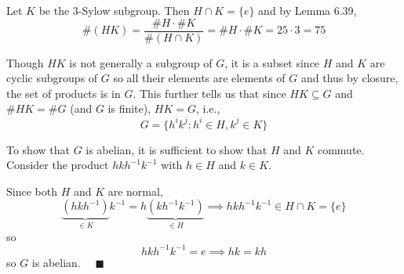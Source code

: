 \documentclass[12pt]{article}
\newcommand{\qed}{\quad \blacksquare}
\begin{document}
\begin{enumerate}
            Let $K$ be the 3-Sylow subgroup. Then $H \cap K = \{e\}$ and by Lemma 6.39,
            \[\#(HK) = \frac{\#H \cdot \#K}{\#(H \cap K)} = \#H \cdot \#K = 25 \cdot 3 = 75\]

            Though $HK$ is not generally a subgroup of $G$, it is a subset since $H$ and $K$ are cyclic subgroups of $G$ so all their elements are elements of $G$ and thus by closure, the set of products is in $G$. This further tells us that since $HK \subseteq G$ and $\#HK = \#G$ (and $G$ is finite), $HK = G$, i.e., 
            \[G = \{h^i k^j : h^i \in H, k^j \in K\}\]

            To show that $G$ is abelian, it is sufficient to show that $H$ and $K$ commute. Consider the product $hkh^{-1}k^{-1}$ with $h \in H$ and $k \in K$.

            Since both $H$ and $K$ are normal, 
            \[\underbrace{(hkh^{-1})}_{\in K}k^{-1} = h\underbrace{(kh^{-1}k^{-1})}_{\in H} \implies hkh^{-1}k^{-1} \in H \cap K = \{e\}\] 
            so 
            \[hkh^{-1}k^{-1} = e \implies hk = kh\]
            so $G$ is abelian. $\qed$
        \color{black}
    
\end{enumerate}
\end{document}
